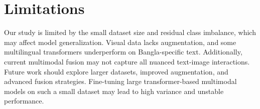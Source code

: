 \documentclass[11pt]{article}
\begin{document}
\section*{Limitations}

Our study is limited by the small dataset size and residual class imbalance, which may affect model generalization. Visual data lacks augmentation, and some multilingual transformers underperform on Bangla-specific text. Additionally, current multimodal fusion may not capture all nuanced text-image interactions. Future work should explore larger datasets, improved augmentation, and advanced fusion strategies. Fine-tuning large transformer-based multimodal models on such a small dataset may lead to high variance and unstable performance.




%


\appendix
\end{document}
